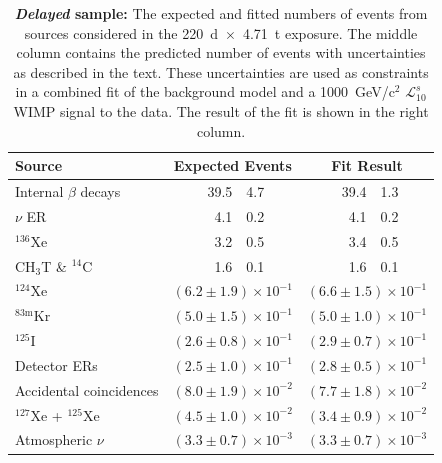 \setlength{\tabcolsep}{12pt} 
\begin{table}[ht]
    \centering
    \caption{\textbf{\emph{Delayed} sample:}
    The expected and fitted numbers of events from sources considered in the 220~d~$\times$~4.71~t exposure.
    The middle column contains the predicted number of events with uncertainties as described in the text.
    These uncertainties are used as constraints in a combined fit of the background model and a 1000~GeV/c$^2$ $\mathcal{L}^{s}_{10}$ WIMP signal to the data.
    The result of the fit is shown in the right column.}
    \begin{tabular}{l
            r@{$\,\pm\,$}l
            r@{$\,\pm\,$}l}
     \hline 
     \hline 
     Source & \multicolumn{2}{c}{Expected Events} & \multicolumn{2}{c}{Fit Result} \\ \hline
     Internal $\beta$ decays          & 39.5    & 4.7            & 39.4    & 1.3 \\
     $\nu$ ER                         & 4.1     & 0.2            & 4.1     & 0.2 \\
     $^{136}$Xe                       & 3.2     & 0.5            & 3.4     & 0.5 \\
     CH$_3$T \& $^{14}$C              & 1.6     & 0.1            & 1.6     & 0.1 \\
     $^{124}$Xe                      & \multicolumn{2}{c}{$(6.2 \pm 1.9) \times 10^{-1}$} & \multicolumn{2}{c}{$(6.6 \pm 1.5) \times 10^{-1}$} \\
     $^{83\mathrm{m}}$Kr             & \multicolumn{2}{c}{$(5.0 \pm 1.5) \times 10^{-1}$} & \multicolumn{2}{c}{$(5.0 \pm 1.0) \times 10^{-1}$} \\
     $^{125}$I                       & \multicolumn{2}{c}{$(2.6 \pm 0.8) \times 10^{-1}$} & \multicolumn{2}{c}{$(2.9 \pm 0.7) \times 10^{-1}$} \\
     Detector ERs                    & \multicolumn{2}{c}{$(2.5 \pm 1.0) \times 10^{-1}$} & \multicolumn{2}{c}{$(2.8 \pm 0.5) \times 10^{-1}$} \\
     Accidental coincidences         & \multicolumn{2}{c}{$(8.0 \pm 1.9) \times 10^{-2}$} & \multicolumn{2}{c}{$(7.7 \pm 1.8) \times 10^{-2}$} \\
     $^{127}$Xe + $^{125}$Xe         & \multicolumn{2}{c}{$(4.5 \pm 1.0) \times 10^{-2}$} & \multicolumn{2}{c}{$(3.4 \pm 0.9) \times 10^{-2}$} \\
     Atmospheric $\nu$               & \multicolumn{2}{c}{$(3.3 \pm 0.7) \times 10^{-3}$} & \multicolumn{2}{c}{$(3.3 \pm 0.7) \times 10^{-3}$} \\

\end{tabular}
\end{table}
